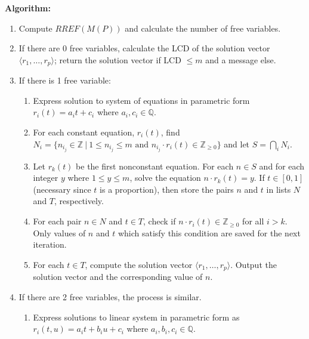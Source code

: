 \documentclass{elsarticle}
\theoremstyle{definition}
\theoremstyle{remark}
\theoremstyle{plain}
\theoremstyle{plain}
\begin{document}
\noindent \textbf{Algorithm:}
\begin{enumerate}
\item Compute $RREF(M(P))$ and calculate the number of free variables.
    \item If there are 0 free variables, calculate the LCD of the solution vector $ \langle r_1, \ldots, r_p \rangle$; return the solution vector if LCD $\leq m$ and a message else.
     \item If there is 1 free variable:
        \begin{enumerate}
            \item Express solution to system of equations in parametric form $r_i(t) = a_it + c_i$ where $a_i, c_i \in \mathbb{Q}$.
           
            \item For each constant equation, $r_i(t)$, find $N_i = \{n_{i_j} \in \mathbb{Z} \: | \: 1 \leq n_{i_j} \leq m \text{ and } n_{i_j} \cdot r_i(t) \in \mathbb{Z}_{\geq 0}  \}$ and let $S = \displaystyle \bigcap_i N_i$.
          
            \item Let $r_k(t)$ be the first nonconstant equation. For each $n \in S$ and for each integer $y$ where $1 \leq y \leq m$, solve the equation $n \cdot r_k(t) = y$. If $t \in [0,1]$ (necessary since $t$ is a proportion), then store the pairs $n$ and $t$ in lists $N$ and $T$, respectively.
            
            \item For each  pair $n \in N$ and $t \in T$, check if $n \cdot r_i(t) \in \mathbb{Z}_{\geq 0}$ for all $i > k$. Only values of $n$ and $t$ which satisfy this condition are saved for the next iteration.
            \item For each $t \in T$, compute the solution vector $\langle r_1, \ldots, r_p \rangle$. Output the solution vector and the corresponding value of $n$. 
        \end{enumerate}
    \item If there are 2 free variables, the process is similar.
        \begin{enumerate}
          
            \item Express solutions to linear system in parametric form as $r_i(t,u) = a_i t + b_i u + c_i$ where $a_i, b_i, c_i \in \mathbb{Q}$.
         

\end{enumerate}
\end{enumerate}
\end{document}
